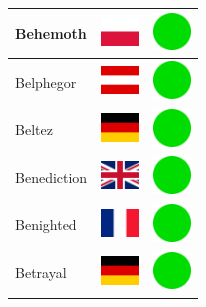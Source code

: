 \documentclass[12pt, a4paper, twoside]{report}
\begin{document}
\begin{center}
\begin{longtable}{|p{5cm}|p{2cm}|p{2cm}|}
 Behemoth                                                   & \includegraphics[width=1cm]{4x3/pl} &   \includegraphics[width=1cm]{likes/y} \\ \hline
 Belphegor                                                  & \includegraphics[width=1cm]{4x3/at} &   \includegraphics[width=1cm]{likes/y} \\ \hline
 Beltez                                                     & \includegraphics[width=1cm]{4x3/de} &   \includegraphics[width=1cm]{likes/y} \\ \hline
 Benediction                                                & \includegraphics[width=1cm]{4x3/gb} &   \includegraphics[width=1cm]{likes/y} \\ \hline
 Benighted                                                  & \includegraphics[width=1cm]{4x3/fr} &   \includegraphics[width=1cm]{likes/y} \\ \hline
 Betrayal                                                   & \includegraphics[width=1cm]{4x3/de} &   \includegraphics[width=1cm]{likes/y} \\ \hline

\end{longtable}
\end{center}
\end{document}
